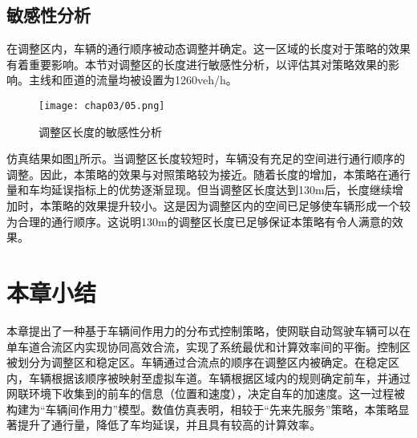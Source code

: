 \subsection{敏感性分析}
在调整区内，车辆的通行顺序被动态调整并确定。这一区域的长度对于策略的效果有着重要影响。本节对调整区的长度进行敏感性分析，以评估其对策略效果的影响。主线和匝道的流量均被设置为1260veh/h。
\begin{figure}[htbp]
    \centering
    \texttt{[image: chap03/05.png]}
    \caption{调整区长度的敏感性分析}
    \label{fig:sensitivity}
\end{figure}
仿真结果如图\ref{fig:sensitivity}所示。当调整区长度较短时，车辆没有充足的空间进行通行顺序的调整。因此，本策略的效果与对照策略较为接近。随着长度的增加，本策略在通行量和车均延误指标上的优势逐渐显现。但当调整区长度达到130m后，长度继续增加时，本策略的效果提升较小。这是因为调整区内的空间已足够使车辆形成一个较为合理的通行顺序。这说明130m的调整区长度已足够保证本策略有令人满意的效果。

\section{本章小结}
本章提出了一种基于车辆间作用力的分布式控制策略，使网联自动驾驶车辆可以在单车道合流区内实现协同高效合流，实现了系统最优和计算效率间的平衡。控制区被划分为调整区和稳定区。车辆通过合流点的顺序在调整区内被确定。在稳定区内，车辆根据该顺序被映射至虚拟车道。车辆根据区域内的规则确定前车，并通过网联环境下收集到的前车的信息（位置和速度），决定自车的加速度。这一过程被构建为“车辆间作用力”模型。数值仿真表明，相较于“先来先服务”策略，本策略显著提升了通行量，降低了车均延误，并且具有较高的计算效率。
